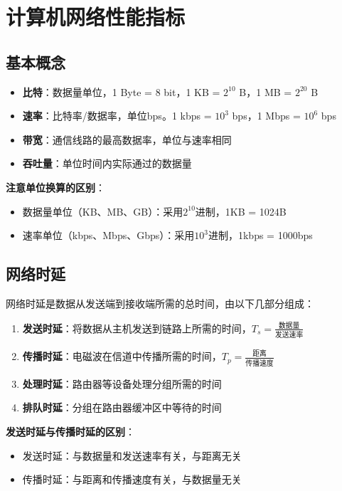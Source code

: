 \section{计算机网络性能指标}
\subsection{基本概念}
\begin{itemize}[leftmargin=2em,itemsep=0pt]
    \item \textbf{比特}：数据量单位，1 Byte = 8 bit，1 KB = $2^{10}$ B，1 MB = $2^{20}$ B
    \item \textbf{速率}：比特率/数据率，单位bps。1 kbps = $10^3$ bps，1 Mbps = $10^6$ bps
    \item \textbf{带宽}：通信线路的最高数据率，单位与速率相同
    \item \textbf{吞吐量}：单位时间内实际通过的数据量
\end{itemize}

\begin{tipbox}
\textbf{注意单位换算的区别}：
\begin{itemize}[itemsep=0pt]
    \item 数据量单位（KB、MB、GB）：采用$2^{10}$进制，1KB = 1024B
    \item 速率单位（kbps、Mbps、Gbps）：采用$10^3$进制，1kbps = 1000bps
\end{itemize}
\end{tipbox}

\subsection{网络时延}
网络时延是数据从发送端到接收端所需的总时间，由以下几部分组成：

\begin{enumerate}[leftmargin=2em,itemsep=0pt]
    \item \textbf{发送时延}：将数据从主机发送到链路上所需的时间，$T_s = \frac{\text{数据量}}{\text{发送速率}}$
    \item \textbf{传播时延}：电磁波在信道中传播所需的时间，$T_p = \frac{\text{距离}}{\text{传播速度}}$
    \item \textbf{处理时延}：路由器等设备处理分组所需的时间
    \item \textbf{排队时延}：分组在路由器缓冲区中等待的时间
\end{enumerate}

\begin{notebox}
\textbf{发送时延与传播时延的区别}：
\begin{itemize}[itemsep=0pt]
    \item 发送时延：与数据量和发送速率有关，与距离无关
    \item 传播时延：与距离和传播速度有关，与数据量无关
\end{itemize}
\end{notebox}

